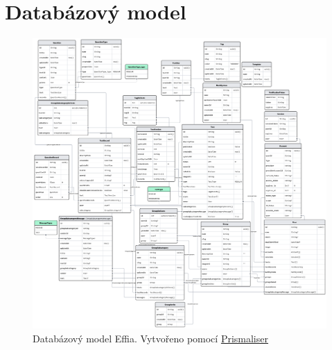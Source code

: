 \documentclass[12pt, a4paper,
openright
]{report}
\let\oldchapter\chapter
\renewcommand{\chapter}{
	\clearpage
	\pagestyle{fancy}
	\oldchapter
}
\begin{document}
	\chapter{
		Databázový model}

	\begin{figure}[H]
		\centering %
		\includegraphics[width=1\linewidth]{image/schema.png} 
		\caption{Databázový model Effia. Vytvořeno pomocí \href{https://github.com/Ovyerus/prismaliser}{Prismaliser}} %
		\label{fig:schema} %
	\end{figure}
	
\end{document}
